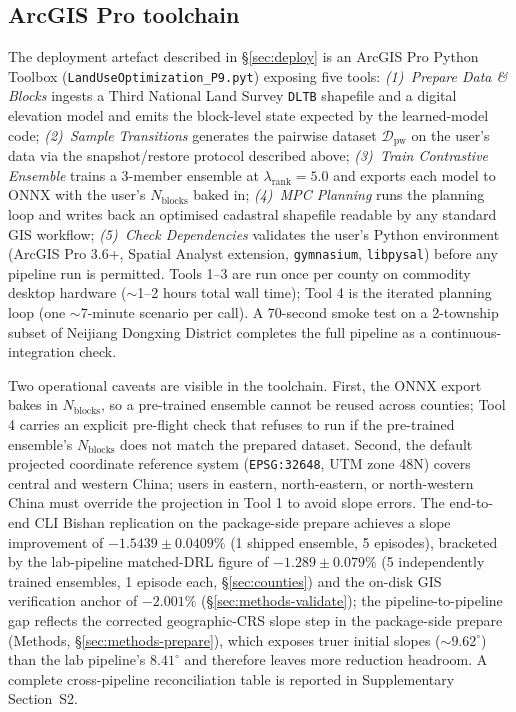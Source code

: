 \documentclass[11pt]{article}
\begin{document}
\subsection*{ArcGIS Pro toolchain}\label{sec:methods-toolchain}

The deployment artefact described in \S\ref{sec:deploy} is an ArcGIS Pro Python Toolbox (\texttt{LandUseOptimization\_P9.pyt}) exposing five tools: \emph{(1)~Prepare Data \& Blocks} ingests a Third National Land Survey \texttt{DLTB} shapefile and a digital elevation model and emits the block-level state expected by the learned-model code; \emph{(2)~Sample Transitions} generates the pairwise dataset $\mathcal{D}_{\text{pw}}$ on the user's data via the snapshot/restore protocol described above; \emph{(3)~Train Contrastive Ensemble} trains a 3-member ensemble at $\lambda_{\text{rank}}{=}5.0$ and exports each model to ONNX with the user's $N_{\text{blocks}}$ baked in; \emph{(4)~MPC Planning} runs the planning loop and writes back an optimised cadastral shapefile readable by any standard GIS workflow; \emph{(5)~Check Dependencies} validates the user's Python environment (ArcGIS Pro 3.6+, Spatial Analyst extension, \texttt{gymnasium}, \texttt{libpysal}) before any pipeline run is permitted. Tools 1--3 are run once per county on commodity desktop hardware ($\sim$1--2 hours total wall time); Tool 4 is the iterated planning loop (one $\sim$7-minute scenario per call). A 70-second smoke test on a 2-township subset of Neijiang Dongxing District completes the full pipeline as a continuous-integration check.

Two operational caveats are visible in the toolchain. First, the ONNX export bakes in $N_{\text{blocks}}$, so a pre-trained ensemble cannot be reused across counties; Tool 4 carries an explicit pre-flight check that refuses to run if the pre-trained ensemble's $N_{\text{blocks}}$ does not match the prepared dataset. Second, the default projected coordinate reference system (\texttt{EPSG:32648}, UTM zone 48N) covers central and western China; users in eastern, north-eastern, or north-western China must override the projection in Tool 1 to avoid slope errors. The end-to-end CLI Bishan replication on the package-side prepare achieves a slope improvement of $-1.5439 \pm 0.0409\%$ (1 shipped ensemble, 5 episodes), bracketed by the lab-pipeline matched-DRL figure of $-1.289 \pm 0.079\%$ (5 independently trained ensembles, 1 episode each, \S\ref{sec:counties}) and the on-disk GIS verification anchor of $-2.001\%$ (\S\ref{sec:methods-validate}); the pipeline-to-pipeline gap reflects the corrected geographic-CRS slope step in the package-side prepare (Methods, \S\ref{sec:methods-prepare}), which exposes truer initial slopes ($\sim$$9.62^{\circ}$) than the lab pipeline's $8.41^{\circ}$ and therefore leaves more reduction headroom. A complete cross-pipeline reconciliation table is reported in Supplementary Section~S2.
\end{document}
